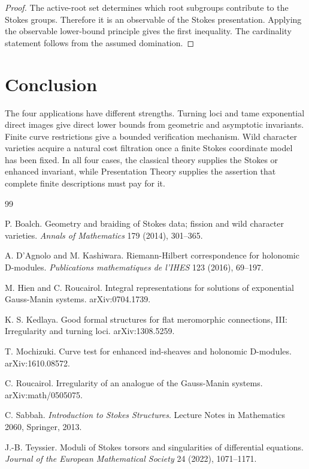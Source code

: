 \documentclass[11pt]{article}
\begin{document}
\begin{proof}
The active-root set determines which root subgroups contribute to the Stokes groups.  Therefore it is an observable of the Stokes presentation.  Applying the observable lower-bound principle gives the first inequality.  The cardinality statement follows from the assumed domination.
\end{proof}

\section{Conclusion}

The four applications have different strengths.  Turning loci and tame exponential direct images give direct lower bounds from geometric and asymptotic invariants.  Finite curve restrictions give a bounded verification mechanism.  Wild character varieties acquire a natural cost filtration once a finite Stokes coordinate model has been fixed.  In all four cases, the classical theory supplies the Stokes or enhanced invariant, while Presentation Theory supplies the assertion that complete finite descriptions must pay for it.

\begin{thebibliography}{99}

P. Boalch.
Geometry and braiding of Stokes data; fission and wild character varieties.
\emph{Annals of Mathematics} 179 (2014), 301--365.

A. D'Agnolo and M. Kashiwara.
Riemann-Hilbert correspondence for holonomic D-modules.
\emph{Publications mathematiques de l'IHES} 123 (2016), 69--197.

M. Hien and C. Roucairol.
Integral representations for solutions of exponential Gauss-Manin systems.
arXiv:0704.1739.

K. S. Kedlaya.
Good formal structures for flat meromorphic connections, III: Irregularity and turning loci.
arXiv:1308.5259.

T. Mochizuki.
Curve test for enhanced ind-sheaves and holonomic D-modules.
arXiv:1610.08572.

C. Roucairol.
Irregularity of an analogue of the Gauss-Manin systems.
arXiv:math/0505075.

C. Sabbah.
\emph{Introduction to Stokes Structures}.
Lecture Notes in Mathematics 2060, Springer, 2013.

J.-B. Teyssier.
Moduli of Stokes torsors and singularities of differential equations.
\emph{Journal of the European Mathematical Society} 24 (2022), 1071--1171.

\end{thebibliography}
\end{document}
